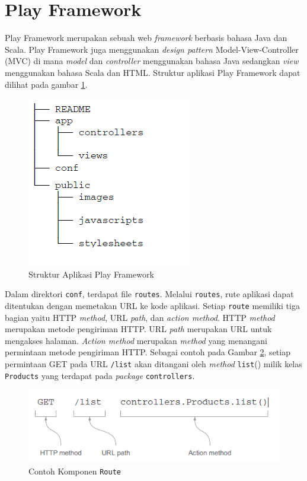 \section{Play Framework}
\label{sec:play}

Play Framework\cite{Leroux:2014} merupakan sebuah web \textit{framework} berbasis bahasa Java dan Scala. Play Framework juga menggunakan \textit{design pattern} Model-View-Controller (MVC) di mana \textit{model} dan \textit{controller} menggunakan bahasa Java sedangkan \textit{view} menggunakan bahasa Scala dan HTML. Struktur aplikasi Play Framework dapat dilihat pada gambar \ref{fig:2_play_dir}.
\begin{figure}[H]
	\centering
	\includegraphics[scale=0.5]{Gambar/play-dir}
	\caption{Struktur Aplikasi Play Framework} 
	\label{fig:2_play_dir}
\end{figure}

Dalam direktori \texttt{conf}, terdapat file \texttt{routes}. Melalui \texttt{routes}, rute aplikasi dapat ditentukan dengan memetakan URL ke kode aplikasi. Setiap \texttt{route} memiliki tiga bagian yaitu HTTP \textit{method}, URL \textit{path}, dan \textit{action method}.  HTTP \textit{method} merupakan metode pengiriman HTTP. URL \textit{path} merupakan URL untuk mengakses halaman. \textit{Action method} merupakan \textit{method} yang menangani permintaan metode pengiriman HTTP. Sebagai contoh pada Gambar \ref{fig:2_routes_example}, setiap permintaan GET pada URL \texttt{/list} akan ditangani oleh \textit{method} \texttt{list}() milik kelas \texttt{Products} yang terdapat pada \textit{package} \texttt{controllers}.

\begin{figure}[H]
	\centering
	\includegraphics[scale=0.5]{Gambar/contoh-routes}
	\caption{Contoh Komponen \texttt{Route}\cite{Leroux:2014}} 
	\label{fig:2_routes_example}
\end{figure}


